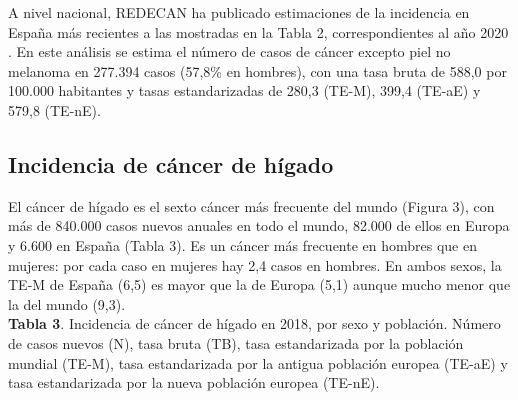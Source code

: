 A nivel nacional, REDECAN ha publicado estimaciones de la incidencia en España más recientes a las mostradas en la Tabla 2, correspondientes al año 2020 \cite{REDECAN2020}. En este análisis se estima el número de casos de cáncer excepto piel no melanoma en 277.394 casos (57,8\% en hombres), con una tasa bruta de 588,0 por 100.000 habitantes y tasas estandarizadas de 280,3 (TE-M), 399,4 (TE-aE) y 579,8 (TE-nE).

\subsection{Incidencia de cáncer de hígado}

El cáncer de hígado es el sexto cáncer más frecuente del mundo (Figura 3), con más de 840.000 casos nuevos anuales en todo el mundo, 82.000 de ellos en Europa y 6.600 en España (Tabla 3). Es un cáncer más frecuente en hombres que en mujeres: por cada caso en mujeres hay 2,4 casos en hombres. En ambos sexos, la TE-M de España (6,5) es mayor que la de Europa (5,1) aunque mucho menor que la del mundo (9,3).\\

\newpage
\textbf{Tabla 3}. Incidencia de cáncer de hígado en 2018, por sexo y población. Número de casos nuevos (N), tasa bruta (TB), tasa estandarizada por la población mundial (TE-M),  tasa estandarizada por la antigua población europea (TE-aE) y  tasa estandarizada por la nueva población europea (TE-nE).

